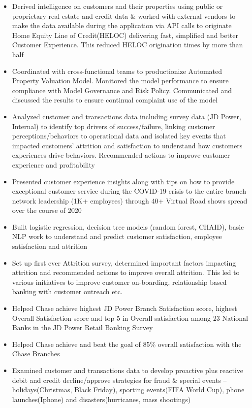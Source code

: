 \documentclass[a4paper,11pt]{article}
\begin{document}
\begin{itemize}\parskip=0cm
\item Derived intelligence on customers and their properties using public or proprietary real-estate and credit data \& worked with external vendors to make the data available during the application via API calls to originate Home Equity Line of Credit(HELOC) delivering fast, simplified and better Customer Experience. This reduced HELOC origination times by more than half
\item Coordinated with cross-functional teams to productionize Automated Property Valuation Model. Monitored the model performance to ensure compliance with Model Governance and Risk Policy. Communicated and discussed the results to ensure continual complaint use of the model
\item Analyzed customer and transactions data including survey data (JD Power, Internal) to identify top drivers of success/failure, linking customer perceptions/behaviors to operational data and isolated key events that impacted customers’ attrition and satisfaction to understand how customers experiences drive behaviors. Recommended actions to improve customer experience and profitability
\item Presented customer experience insights along with tips on how to provide exceptional customer service during the COVID-19 crisis to the entire branch network leadership (1K+ employees) through 40+ Virtual Road shows spread over the course of 2020
\item Built logistic regression, decision tree models (random forest, CHAID), basic NLP work to understand and predict customer satisfaction, employee satisfaction and attrition
\item Set up first ever Attrition survey, determined important factors impacting attrition and recommended actions to improve overall attrition. This led to various initiatives to improve customer on-boarding, relationship based banking with customer outreach etc.
\item Helped Chase achieve highest JD Power Branch Satisfaction score, highest Overall Satisfaction score and top 5 in Overall satisfaction among 23 National Banks in the JD Power Retail Banking Survey
\item Helped Chase achieve and beat the goal of 85\% overall satisfaction with the Chase Branches
\item Examined customer and transactions data to develop proactive plus reactive debit and credit decline/approve strategies for fraud \& special events – holidays(Christmas, Black Friday), sporting events(FIFA World Cup), phone launches(Iphone) and disasters(hurricanes, mass shootings)

\end{itemize}
\end{document}

